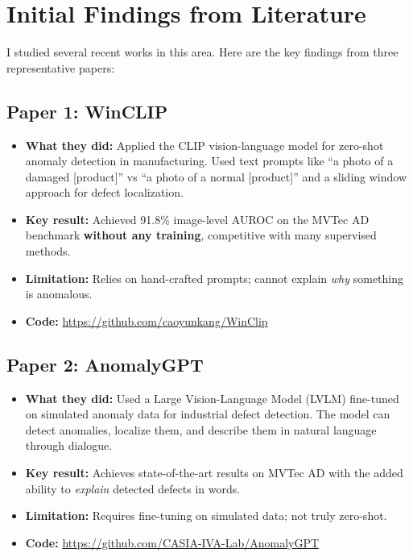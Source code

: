 \documentclass[12pt, a4paper]{article}
\begin{document}
\section{Initial Findings from Literature}

I studied several recent works in this area. Here are the key findings from three representative papers:

\subsection{Paper 1: WinCLIP \cite{jeong2023winclip}}
\begin{itemize}[leftmargin=*]
    \item \textbf{What they did:} Applied the CLIP vision-language model for zero-shot anomaly detection in manufacturing. Used text prompts like ``a photo of a damaged [product]'' vs ``a photo of a normal [product]'' and a sliding window approach for defect localization.
    \item \textbf{Key result:} Achieved 91.8\% image-level AUROC on the MVTec AD benchmark \textbf{without any training}, competitive with many supervised methods.
    \item \textbf{Limitation:} Relies on hand-crafted prompts; cannot explain \textit{why} something is anomalous.
    \item \textbf{Code:} \url{https://github.com/caoyunkang/WinClip}
\end{itemize}

\subsection{Paper 2: AnomalyGPT \cite{gu2024anomalygpt}}
\begin{itemize}[leftmargin=*]
    \item \textbf{What they did:} Used a Large Vision-Language Model (LVLM) fine-tuned on simulated anomaly data for industrial defect detection. The model can detect anomalies, localize them, and describe them in natural language through dialogue.
    \item \textbf{Key result:} Achieves state-of-the-art results on MVTec AD with the added ability to \textit{explain} detected defects in words.
    \item \textbf{Limitation:} Requires fine-tuning on simulated data; not truly zero-shot.
    \item \textbf{Code:} \url{https://github.com/CASIA-IVA-Lab/AnomalyGPT}
\end{itemize}
\end{document}
